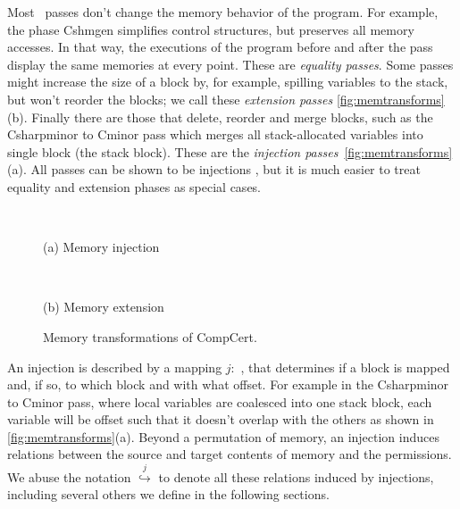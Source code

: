 Most \compcert\ passes don't change the memory behavior of the program. For example, the phase Cshmgen simplifies control structures, but preserves all memory accesses. In that way, the executions of the program before and after the pass display the same memories at every point. These are \emph{equality passes}. Some passes might increase the size of a block by, for example, spilling variables to the stack, but won't reorder the blocks; we call these  \emph{extension passes} \autoref{fig:memtransforms}(b). Finally there are those that delete, reorder and merge blocks, such as the Csharpminor to Cminor pass which merges all stack-allocated variables into  single block (the stack block). These are the \emph{injection passes}\ \autoref{fig:memtransforms}(a). All passes can be shown to be injections \cite{compcomp}, but it is much easier to treat equality and extension phases as special cases. 

\begin{figure}
\begin{multicols}{2}
~~

(a) Memory injection

\columnbreak
~~

(b) Memory extension

%
%
\end{multicols}
\caption[Memory transformations of CompCert]{Memory transformations of CompCert. \cite{appel14:plcc}  }\label{fig:memtransforms}
\end{figure}

An injection is described by a mapping $j:$ , that determines if a block is mapped and, if so, to which block and with what offset. For example in the Csharpminor to Cminor pass, where local variables are coalesced into one stack block, each variable will be offset such that it doesn't overlap with the others as shown in \autoref{fig:memtransforms}(a). Beyond a permutation of memory, an injection induces relations between the source and target contents of memory and the permissions. We abuse the notation $\overset{j}{\hookrightarrow}$ to denote all these relations induced by injections, including several others we define in the following sections. 


